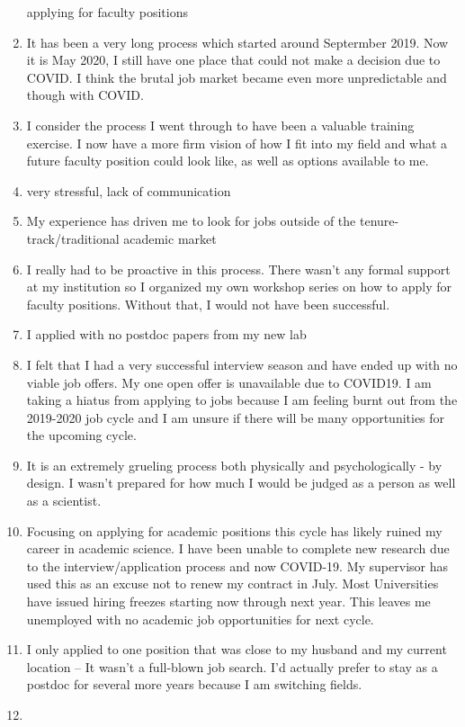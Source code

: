 \documentclass[]{article}
\begin{document}
\begin{enumerate}
  applying for faculty positions
\item
  It has been a very long process which started around Septermber 2019.
  Now it is May 2020, I still have one place that could not make a
  decision due to COVID. I think the brutal job market became even more
  unpredictable and though with COVID.
\item
  I consider the process I went through to have been a valuable training
  exercise. I now have a more firm vision of how I fit into my field and
  what a future faculty position could look like, as well as options
  available to me.
\item
  very stressful, lack of communication
\item
  My experience has driven me to look for jobs outside of the
  tenure-track/traditional academic market
\item
  I really had to be proactive in this process. There wasn't any formal
  support at my institution so I organized my own workshop series on how
  to apply for faculty positions. Without that, I would not have been
  successful.
\item
  I applied with no postdoc papers from my new lab
\item
  I felt that I had a very successful interview season and have ended up
  with no viable job offers. My one open offer is unavailable due to
  COVID19. I am taking a hiatus from applying to jobs because I am
  feeling burnt out from the 2019-2020 job cycle and I am unsure if
  there will be many opportunities for the upcoming cycle.
\item
  It is an extremely grueling process both physically and
  psychologically - by design. I wasn't prepared for how much I would be
  judged as a person as well as a scientist.
\item
  Focusing on applying for academic positions this cycle has likely
  ruined my career in academic science. I have been unable to complete
  new research due to the interview/application process and now
  COVID-19. My supervisor has used this as an excuse not to renew my
  contract in July. Most Universities have issued hiring freezes
  starting now through next year. This leaves me unemployed with no
  academic job opportunities for next cycle.
\item
  I only applied to one position that was close to my husband and my
  current location -- It wasn't a full-blown job search. I'd actually
  prefer to stay as a postdoc for several more years because I am
  switching fields.
\item

\end{enumerate}
\end{document}
